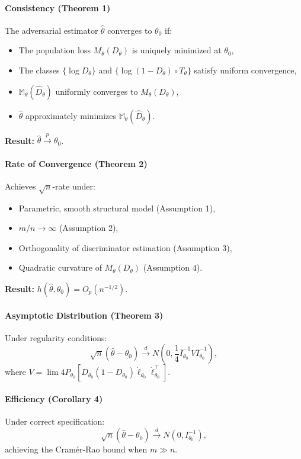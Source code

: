 \documentclass[12pt]{article}
\begin{document}
\paragraph{Consistency (Theorem 1)} The adversarial estimator \(\hat{\theta}\) converges to \(\theta_0\) if:
\begin{itemize}
    \item The population loss \(M_\theta(D_\theta)\) is uniquely minimized at
          \(\theta_0\),
    \item The classes \(\{\log D_\theta\}\) and \(\{\log(1 - D_\theta) \circ T_\theta\}\)
          satisfy uniform convergence,
    \item \(\mathbb{M}_\theta(\hat{D}_\theta)\) uniformly converges to \(M_\theta(D_\theta)\),
    \item \(\hat{\theta}\) approximately minimizes \(\mathbb{M}_\theta(\hat{D}_\theta)\).
\end{itemize}
\textbf{Result:} \(\hat{\theta} \xrightarrow{p} \theta_0\).

\paragraph{Rate of Convergence (Theorem 2)} Achieves \(\sqrt{n}\)-rate under:
\begin{itemize}
    \item Parametric, smooth structural model (Assumption 1),
    \item \(m/n \to \infty\) (Assumption 2),
    \item Orthogonality of discriminator estimation (Assumption 3),
    \item Quadratic curvature of \(M_\theta(D_\theta)\) (Assumption 4).
\end{itemize}
\textbf{Result:} \(h(\hat{\theta}, \theta_0) = O_p(n^{-1/2})\).

\paragraph{Asymptotic Distribution (Theorem 3)} Under regularity conditions:
\[
    \sqrt{n}(\hat{\theta} - \theta_0) \xrightarrow{d} N\left(0, \frac{1}{4} \bar{I}_{\theta_0}^{-1} V \bar{I}_{\theta_0}^{-1}\right),
\]
where \(V = \lim 4P_{\theta_0}[D_{\theta_0}(1 -
        D_{\theta_0})\dot{\ell}_{\theta_0}\dot{\ell}_{\theta_0}^\top]\).

\paragraph{Efficiency (Corollary 4)} Under correct specification:
\[
    \sqrt{n}(\hat{\theta} - \theta_0) \xrightarrow{d} N(0, I_{\theta_0}^{-1}),
\]
achieving the Cramér-Rao bound when \(m \gg n\).
\end{document}
